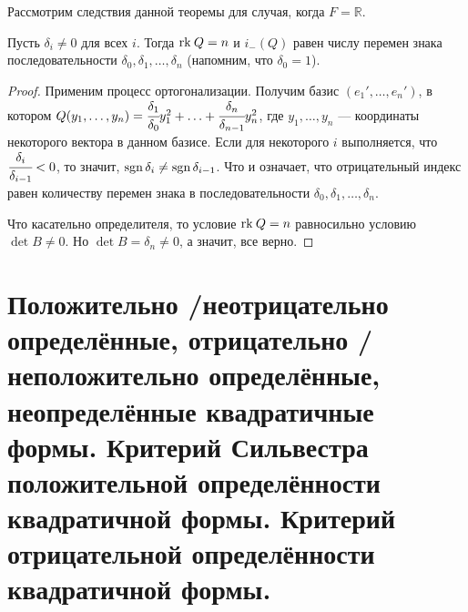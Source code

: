 Рассмотрим следствия данной теоремы для случая, когда $F = \mathbb{R}$.
\begin{Theorem}[Якоби]
	Пусть $\delta_i \neq 0$ для всех $i$. Тогда $\mathrm{rk}\: Q = n$ и $i_{-}(Q)$ равен числу перемен знака последовательности $\delta_0, \delta_1, \ldots, \delta_n$ (напомним, что $\delta_0 = 1$).
\end{Theorem}
\begin{proof}
	Применим процесс ортогонализации. Получим базис $(e_1', \ldots, e_n')$, в котором $ Q(y_1, \ldots, y_n) = \cfrac{\delta_1}{\delta_0}y_1^2 +\ldots + \cfrac{\delta_n}{\delta_{n-1}}y_n^2$, где $y_1, \ldots, y_n$ --- координаты некоторого вектора в данном базисе. Если для некоторого $i$ выполняется, что $\cfrac{\delta_i}{\delta_{i-1}} < 0$, то значит, $\operatorname{\mathop{sgn}} \delta_i \neq \operatorname{\mathop{sgn}} \delta_{i - 1}$. Что и означает, что отрицательный индекс равен количеству перемен знака в последовательности $\delta_0, \delta_1, \ldots, \delta_n$.
	
	Что касательно определителя, то условие  $\mathrm{rk}\: Q = n$ равносильно условию $\det B \neq 0$. Но $\det B = \delta_n \neq 0$, а значит, все верно.
\end{proof}

\section{Положительно \slash неотрицательно определённые, отрицательно \slash неположительно определённые, неопределённые квадратичные формы. Критерий Сильвестра положительной определённости квадратичной формы. Критерий отрицательной определённости квадратичной формы.}

